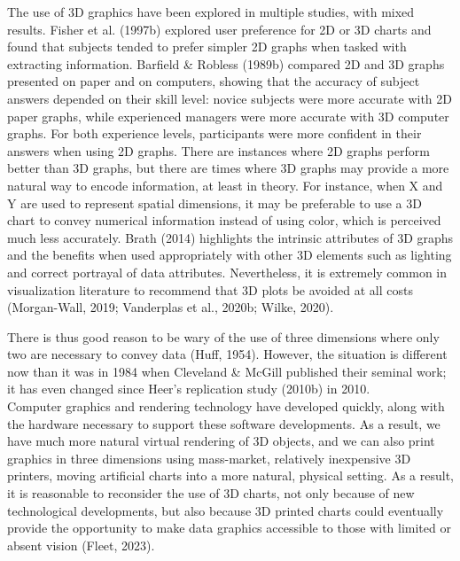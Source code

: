 \documentclass[phd]{nuthesis}
\begin{document}
The use of 3D graphics have been explored in multiple studies, with
mixed results. Fisher et al. (1997b) explored user preference for 2D or
3D charts and found that subjects tended to prefer simpler 2D graphs
when tasked with extracting information. Barfield \& Robless (1989b)
compared 2D and 3D graphs presented on paper and on computers, showing
that the accuracy of subject answers depended on their skill level:
novice subjects were more accurate with 2D paper graphs, while
experienced managers were more accurate with 3D computer graphs. For
both experience levels, participants were more confident in their
answers when using 2D graphs. There are instances where 2D graphs
perform better than 3D graphs, but there are times where 3D graphs may
provide a more natural way to encode information, at least in theory.
For instance, when X and Y are used to represent spatial dimensions, it
may be preferable to use a 3D chart to convey numerical information
instead of using color, which is perceived much less accurately. Brath
(2014) highlights the intrinsic attributes of 3D graphs and the benefits
when used appropriately with other 3D elements such as lighting and
correct portrayal of data attributes. Nevertheless, it is extremely
common in visualization literature to recommend that 3D plots be avoided
at all costs (Morgan-Wall, 2019; Vanderplas et al., 2020b; Wilke, 2020).

There is thus good reason to be wary of the use of three dimensions
where only two are necessary to convey data (Huff, 1954). However, the
situation is different now than it was in 1984 when Cleveland \& McGill
published their seminal work; it has even changed since Heer's
replication study (2010b) in 2010.\\
Computer graphics and rendering technology have developed quickly, along
with the hardware necessary to support these software developments. As a
result, we have much more natural virtual rendering of 3D objects, and
we can also print graphics in three dimensions using mass-market,
relatively inexpensive 3D printers, moving artificial charts into a more
natural, physical setting. As a result, it is reasonable to reconsider
the use of 3D charts, not only because of new technological
developments, but also because 3D printed charts could eventually
provide the opportunity to make data graphics accessible to those with
limited or absent vision (Fleet, 2023).
\end{document}
